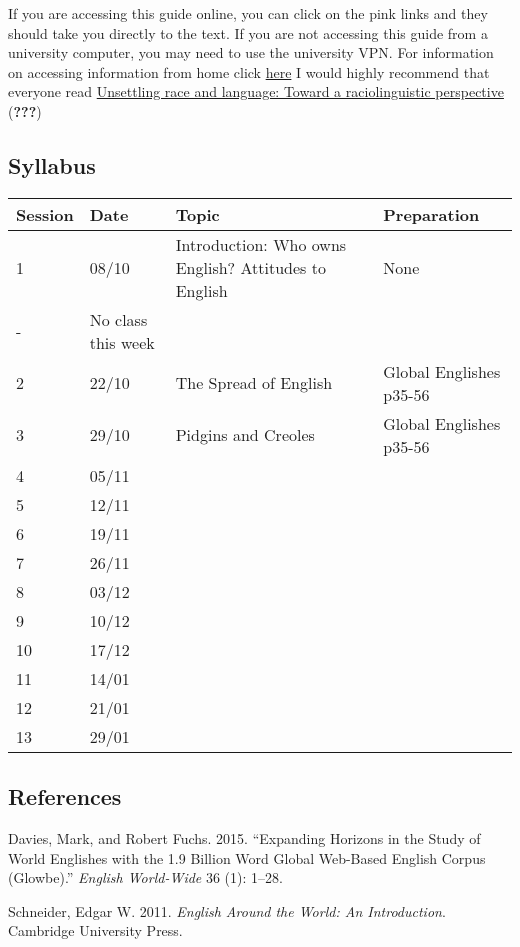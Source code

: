 \documentclass[
]{article}
\newlength{\cslhangindent}
\newenvironment{cslreferences}%
  {\setlength{\parindent}{0pt}%
  \everypar{\setlength{\hangindent}{\cslhangindent}}\ignorespaces}%
  {\par}
\begin{document}
If you are accessing this guide online, you can click on the pink links
and they should take you directly to the text. If you are not accessing
this guide from a university computer, you may need to use the
university VPN. For information on accessing information from home click
\href{https://www.uni-salzburg.at/index.php?id=32331}{here} I would
highly recommend that everyone read
\href{https://www.cambridge.org/core/services/aop-cambridge-core/content/view/30FFC5253F465905D75CDFF1C1363AE3/S0047404517000562a.pdf/unsettling_race_and_language_toward_a_raciolinguistic_perspective.pdf}{Unsettling
race and language: Toward a raciolinguistic perspective}
({\textbf{???}})

\hypertarget{syllabus}{%
\subsection{Syllabus}\label{syllabus}}

\begin{longtable}[]{@{}llll@{}}
\toprule
Session & Date & Topic & Preparation\tabularnewline
\midrule
\endhead
1 & 08/10 & Introduction: Who owns English? Attitudes to English &
None\tabularnewline
- & No class this week & &\tabularnewline
2 & 22/10 & The Spread of English & Global Englishes
p35-56\tabularnewline
3 & 29/10 & Pidgins and Creoles & Global Englishes p35-56\tabularnewline
4 & 05/11 & &\tabularnewline
5 & 12/11 & &\tabularnewline
6 & 19/11 & &\tabularnewline
7 & 26/11 & &\tabularnewline
8 & 03/12 & &\tabularnewline
9 & 10/12 & &\tabularnewline
10 & 17/12 & &\tabularnewline
11 & 14/01 & &\tabularnewline
12 & 21/01 & &\tabularnewline
13 & 29/01 & &\tabularnewline
\bottomrule
\end{longtable}

\hypertarget{references}{%
\subsection*{References}\label{references}}

\hypertarget{refs}{}
\begin{cslreferences}
\leavevmode\hypertarget{ref-davies2015expanding}{}%
Davies, Mark, and Robert Fuchs. 2015. ``Expanding Horizons in the Study
of World Englishes with the 1.9 Billion Word Global Web-Based English
Corpus (Glowbe).'' \emph{English World-Wide} 36 (1): 1--28.

\leavevmode\hypertarget{ref-schneider2011english}{}%
Schneider, Edgar W. 2011. \emph{English Around the World: An
Introduction}. Cambridge University Press.
\end{cslreferences}
\end{document}
